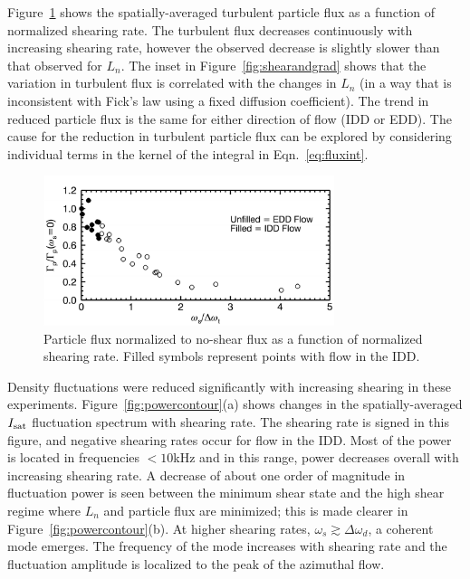 \documentclass[aps,prl,amsmath,amssymb,preprint,superscriptaddress]{revtex4}
\begin{document}
Figure~\ref{fig:fluxvsshear} shows the spatially-averaged turbulent
particle flux as a function of normalized shearing rate.  The
turbulent flux decreases continuously with increasing shearing rate,
however the observed decrease is slightly slower than that observed
for $L_n$.  The inset in Figure~\ref{fig:shearandgrad} shows that the variation in
turbulent flux is correlated with the changes in $L_n$ (in a way
that is inconsistent with Fick's law using a fixed diffusion coefficient).  The
trend in reduced particle flux is the same for either direction of
flow (IDD or EDD).  The cause for the reduction in turbulent particle
flux can be explored by considering individual terms in the kernel of
the integral in Eqn.~\ref{eq:fluxint}.


\begin{figure}[!htbp]
\centerline{
\includegraphics[width=8.5cm]{fluxvsshear.pdf}}
\caption{\label{fig:fluxvsshear} Particle flux normalized to no-shear
  flux as a function of normalized shearing rate. Filled symbols
  represent points with flow in the IDD.}
\end{figure}


Density fluctuations were reduced significantly with increasing
shearing in these experiments.  Figure~\ref{fig:powercontour}(a) shows
changes in the spatially-averaged $I_{\rm sat}$ fluctuation spectrum
with shearing rate.  The shearing rate is signed in this figure, and
negative shearing rates occur for flow in the IDD. Most of the power
is located in frequencies $<10$kHz and in this range, power decreases
overall with increasing shearing rate.  A decrease of about one order
of magnitude in fluctuation power is seen between the minimum shear
state and the high shear regime where $L_n$ and particle flux are
minimized; this is made clearer in Figure~\ref{fig:powercontour}(b).  At
higher shearing rates, $\omega_s \gtrsim \Delta \omega_d$, a coherent
mode emerges.  The frequency of the mode increases with shearing rate
and the fluctuation amplitude is localized to the peak of the
azimuthal flow.
\end{document}
